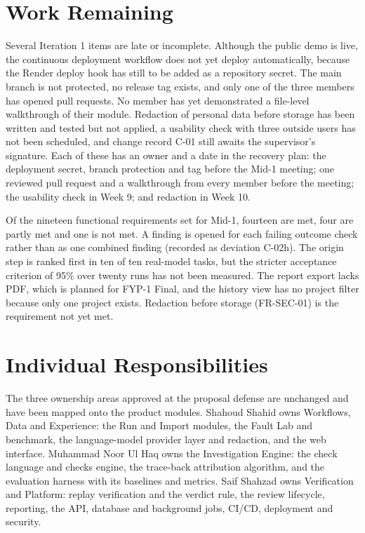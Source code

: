 \section{Work Remaining}

Several Iteration 1 items are late or incomplete. Although the public demo is live, the continuous deployment workflow does not yet deploy automatically, because the Render deploy hook has still to be added as a repository secret. The main branch is not protected, no release tag exists, and only one of the three members has opened pull requests. No member has yet demonstrated a file-level walkthrough of their module. Redaction of personal data before storage has been written and tested but not applied, a usability check with three outside users has not been scheduled, and change record C-01 still awaits the supervisor's signature. Each of these has an owner and a date in the recovery plan: the deployment secret, branch protection and tag before the Mid-1 meeting; one reviewed pull request and a walkthrough from every member before the meeting; the usability check in Week 9; and redaction in Week 10.

Of the nineteen functional requirements set for Mid-1, fourteen are met, four are partly met and one is not met. A finding is opened for each failing outcome check rather than as one combined finding (recorded as deviation C-02h). The origin step is ranked first in ten of ten real-model tasks, but the stricter acceptance criterion of 95\% over twenty runs has not been measured. The report export lacks PDF, which is planned for FYP-1 Final, and the history view has no project filter because only one project exists. Redaction before storage (FR-SEC-01) is the requirement not yet met.

\section{Individual Responsibilities}

The three ownership areas approved at the proposal defense are unchanged and have been mapped onto the product modules. Shahoud Shahid owns Workflows, Data and Experience: the Run and Import modules, the Fault Lab and benchmark, the language-model provider layer and redaction, and the web interface. Muhammad Noor Ul Haq owns the Investigation Engine: the check language and checks engine, the trace-back attribution algorithm, and the evaluation harness with its baselines and metrics. Saif Shahzad owns Verification and Platform: replay verification and the verdict rule, the review lifecycle, reporting, the API, database and background jobs, CI/CD, deployment and security.

